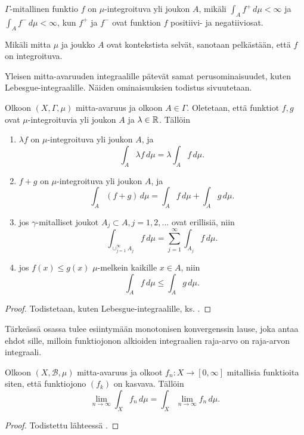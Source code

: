 \documentclass[12pt,oneside,a4paper]{amsbook} %
\begin{document}
\begin{definition}
    $\Gamma$-mitallinen funktio $f$ on $\mu$-integroituva yli joukon $A$, mikäli $\int_A f^+ \, d\mu < \infty$ ja $\int_A f^-\, d\mu < \infty$, kun $f^+$ ja $f^-$ ovat funktion $f$ positiivi- ja negatiiviosat.
\end{definition}
Mikäli mitta $\mu$ ja joukko $A$ ovat kontekstista selvät, sanotaan pelkästään, että $f$ on integroituva.

Yleisen mitta-avaruuden integraalille pätevät samat perusominaisuudet, kuten Lebesgue-integraalille. Näiden ominaisuuksien todistus sivuutetaan.
\begin{lemma}\label{le:integralProperties}
    Olkoon $(X, \Gamma, \mu)$ mitta-avaruus ja olkoon $A\in \Gamma$. Oletetaan, että funktiot $f, g$ ovat $\mu$-integroituvia yli joukon $A$ ja $\lambda \in \mathbb{R}$. Tällöin
    \begin{enumerate}
        \item $\lambda f$ on $\mu$-integroituva yli joukon $A$, ja 
        \begin{equation*}
            \int_A \lambda f \, d\mu = \lambda \int_A f \, d\mu.
        \end{equation*}
        \item $f + g$ on $\mu$-integroituva yli joukon $A$, ja
        \begin{equation*}
            \int_A  (f+g) \, d\mu = \int_A  f \, d\mu + \int_A  g \, d\mu.
        \end{equation*}
        \item jos $\gamma$-mitalliset joukot $A_j \subset A, j = 1, 2, ...$ ovat erillisiä, niin
        \begin{equation*}
            \int_{\cup_{j=1}^\infty A_j}f \, d\mu = \sum_{j=1}^\infty \int_{A_j} f\, d\mu.
        \end{equation*}
        \item jos $f(x) \le g(x)$ $\mu$-melkein kaikille $x \in A$, niin 
        \begin{equation*}
            \int_A f \, d\mu \le \int_A g \, d\mu.
        \end{equation*}
    \end{enumerate}
\end{lemma}
\begin{proof}
    Todistetaan, kuten Lebesgue-integraalille, ks. \cite[s. 113]{lehrbäck}.
\end{proof}

Tärkeässä osassa tulee esiintymään monotonisen konvergenssin lause, joka antaa ehdot sille, milloin funktiojonon alkioiden integraalien raja-arvo on raja-arvon integraali.
\begin{theorem} \label{thm:monoConvThm}
    Olkoon $(X, \mathcal{B}, \mu)$ mitta-avaruus ja olkoot $f_n:X\to [0, \infty]$ mitallisia funktioita siten, että funktiojono $(f_k)$ on kasvava. Tällöin
    \begin{equation*}
        \lim_{n\to\infty} \int_X f_n \, d\mu = \int_X \lim_{n\to \infty} f_n \, d\mu.
    \end{equation*}
\end{theorem}
\begin{proof}
    Todistettu lähteessä \cite[s. 107]{tao}.
\end{proof}
\end{document}
